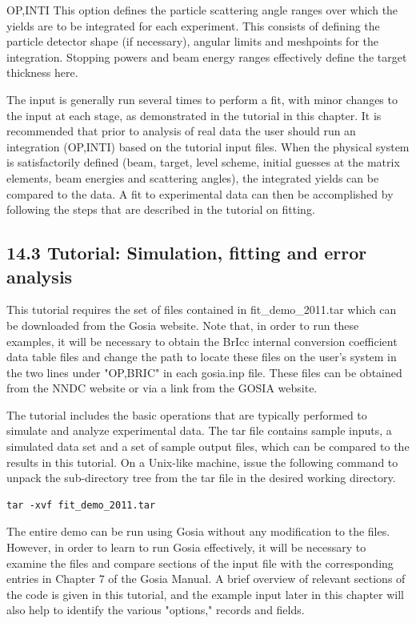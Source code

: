 \documentclass[10pt]{article}
\begin{document}
OP,INTI This option defines the particle scattering angle ranges over which the yields are to be integrated for each experiment. This consists of defining the particle detector shape (if necessary), angular limits and meshpoints for the integration. Stopping powers and beam energy ranges effectively define the target thickness here.

The input is generally run several times to perform a fit, with minor changes to the input at each stage, as demonstrated in the tutorial in this chapter. It is recommended that prior to analysis of real data the user should run an integration (OP,INTI) based on the tutorial input files. When the physical system is satisfactorily defined (beam, target, level scheme, initial guesses at the matrix elements, beam energies and scattering angles), the integrated yields can be compared to the data. A fit to experimental data can then be accomplished by following the steps that are described in the tutorial on fitting.

\subsection*{14.3 Tutorial: Simulation, fitting and error analysis}
This tutorial requires the set of files contained in fit\_demo\_2011.tar which can be downloaded from the Gosia website. Note that, in order to run these examples, it will be necessary to obtain the BrIcc internal conversion coefficient data table files and change the path to locate these files on the user's system in the two lines under "OP,BRIC" in each gosia.inp file. These files can be obtained from the NNDC website or via a link from the GOSIA website.

The tutorial includes the basic operations that are typically performed to simulate and analyze experimental data. The tar file contains sample inputs, a simulated data set and a set of sample output files, which can be compared to the results in this tutorial. On a Unix-like machine, issue the following command to unpack the sub-directory tree from the tar file in the desired working directory.

\begin{verbatim}
tar -xvf fit_demo_2011.tar
\end{verbatim}

The entire demo can be run using Gosia without any modification to the files. However, in order to learn to run Gosia effectively, it will be necessary to examine the files and compare sections of the input file with the corresponding entries in Chapter 7 of the Gosia Manual. A brief overview of relevant sections of the code is given in this tutorial, and the example input later in this chapter will also help to identify the various "options," records and fields.
\end{document}
